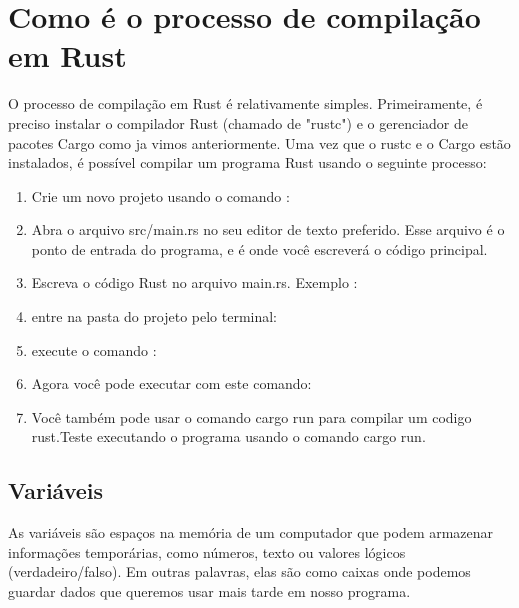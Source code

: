 \documentclass[12pt,a4paper,oneside]{abntex2}
\begin{document}
\section{Como é o processo de compilação em Rust}

O processo de compilação em Rust é relativamente simples. Primeiramente, é preciso instalar o compilador Rust (chamado de "rustc") e o gerenciador de pacotes Cargo como ja vimos anteriormente.
Uma vez que o rustc e o Cargo estão instalados, é possível compilar um programa Rust usando o seguinte processo:
\begin{enumerate}
    \item Crie um novo projeto usando o comando :
    \item Abra o arquivo src/main.rs no seu editor de texto preferido. Esse arquivo é o ponto de entrada do programa, e é onde você escreverá o código principal.
    \item Escreva o código Rust no arquivo main.rs. Exemplo :
    \item entre na pasta do projeto pelo terminal:
    \item execute o comando :
    \item Agora você pode executar com este comando:
    \item Você também pode usar o comando  cargo run para compilar um codigo rust.Teste executando o programa usando o comando cargo run.
\end{enumerate}

\subsection{Variáveis}
As variáveis são espaços na memória de um computador que podem armazenar informações temporárias, como números, texto ou valores lógicos (verdadeiro/falso). Em outras palavras, elas são como caixas onde podemos guardar dados que queremos usar mais tarde em nosso programa.
\end{document}

